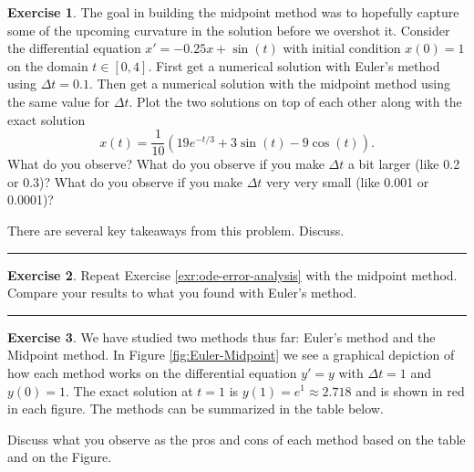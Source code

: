 \documentclass[
]{book}
\theoremstyle{definition}
\theoremstyle{definition}
\theoremstyle{definition}
\newtheorem{exercise}{Exercise}[chapter]
\theoremstyle{remark}
\begin{document}
\begin{exercise}
\protect\hypertarget{exr:unnamed-chunk-444}{}{\label{exr:unnamed-chunk-444} }The goal in building the midpoint method was to hopefully capture some of the upcoming curvature in the solution before we overshot it. Consider the differential equation \(x' = -0.25x + \sin(t)\) with initial condition \(x(0) = 1\) on the domain \(t \in [0,4]\). First get a numerical solution with Euler's method using \(\Delta t = 0.1\). Then get a numerical solution with the midpoint method using the same value for \(\Delta t\). Plot the two solutions on top of each other along with the exact solution
\[ x(t) = \frac{1}{10} \left( 19e^{-t/3} + 3\sin(t) - 9\cos(t)  \right). \]
What do you observe? What do you observe if you make \(\Delta t\) a bit larger (like 0.2 or 0.3)? What do you observe if you make \(\Delta t\) very very small (like 0.001 or 0.0001)?

There are several key takeaways from this problem. Discuss.
\end{exercise}

\begin{center}\rule{0.5\linewidth}{0.5pt}\end{center}

\begin{exercise}
\protect\hypertarget{exr:unnamed-chunk-445}{}{\label{exr:unnamed-chunk-445} }Repeat Exercise \ref{exr:ode-error-analysis} with the midpoint method. Compare your results to what you found with Euler's method.
\end{exercise}

\begin{center}\rule{0.5\linewidth}{0.5pt}\end{center}

\begin{exercise}
\protect\hypertarget{exr:unnamed-chunk-446}{}{\label{exr:unnamed-chunk-446} }We have studied two methods thus far: Euler's method and the Midpoint method. In Figure \ref{fig:Euler-Midpoint} we see a graphical depiction of how each method works on the differential equation \(y' = y\) with \(\Delta t = 1\) and \(y(0) = 1\). The exact solution at \(t=1\) is \(y(1) = e^1 \approx 2.718\) and is shown in red in each figure. The methods can be summarized in the table below.

Discuss what you observe as the pros and cons of each method based on the table and on the Figure.
\end{exercise}
\end{document}
